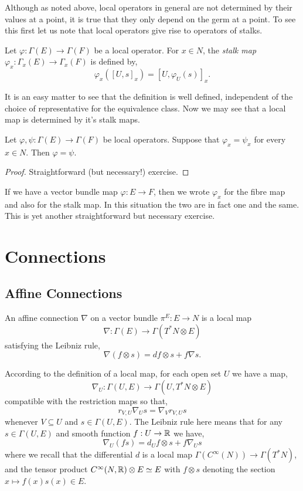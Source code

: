 \documentclass{amsart}
\begin{document}
Although as noted above, local operators in general are not determined by their values at a point, it is true that they only depend on the germ at a point. To see this first let us note that local operators give rise to operators of stalks.

\begin{defn}
Let \(\varphi : \Gamma(E) \to \Gamma(F)\) be a local operator. For \(x \in N\), the \emph{stalk map} \(\varphi_x : \Gamma_x(E) \to \Gamma_x (F)\) is defined by,
\[
\varphi_x ([U, s]_x) = [U, \varphi_U(s)]_x.
\]
\end{defn}

It is an easy matter to see that the definition is well defined, independent of the choice of representative for the equivalence class. Now we may see that a local map is determined by it's stalk maps.

\begin{lemma}
Let \(\varphi, \psi : \Gamma(E) \to \Gamma(F)\) be local operators. Suppose that \(\varphi_x = \psi_x\) for every \(x \in N\). Then \(\varphi = \psi\).
\end{lemma}

\begin{proof}
Straightforward (but necessary!) exercise.
\end{proof}

\begin{rem}
If we have a vector bundle map \(\varphi : E \to F\), then we wrote \(\varphi_x\) for the fibre map and also for the stalk map. In this situation the two are in fact one and the same. This is yet another straightforward but necessary exercise.
\end{rem}

\section{Connections}

\subsection{Affine Connections}

\begin{defn}
An affine connection \(\nabla\) on a vector bundle \(\pi^E : E \to N\) is a local map
\[
\nabla : \Gamma(E) \to \Gamma(T^{\ast} N \otimes E)
\]
satisfying the Leibniz rule,
\[
\nabla (f \otimes s) = df \otimes s + f \nabla s.
\]
\end{defn}

According to the definition of a local map, for each open set \(U\) we have a map,
\[
\nabla_U : \Gamma(U, E) \to \Gamma(U, T^{\ast} N \otimes E)
\]
compatible with the restriction maps so that,
\[
r_{V, U} \nabla_U s = \nabla_V r_{V, U} s
\]
whenever \(V \subseteq U\) and \(s \in \Gamma(U, E)\). The Leibniz rule here means that for any \(s \in \Gamma(U, E)\) and smooth function \(f : U \to \mathbb{R}\) we have,
\[
\nabla_U (fs) = d_U f \otimes s + f \nabla_U s
\]
where we recall that the differential \(d\) is a local map \(\Gamma(C^{\infty}(N)) \to \Gamma(T^{\ast} N)\), and the tensor product \(C^{\infty}(N, \mathbb{R}) \otimes E \simeq E\) with \(f \otimes s\) denoting the section \(x \mapsto f(x) s(x) \in E\).
\end{document}
